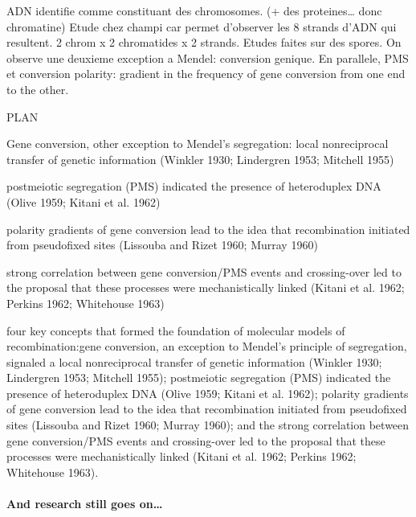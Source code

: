 ADN identifie comme constituant des chromosomes. (+ des proteines… donc chromatine)
Etude chez champi car permet d'observer les 8 strands d'ADN qui resultent. 2 chrom x 2 chromatides x 2 strands.
Etudes faites sur des spores. 
On observe une deuxieme exception a Mendel: conversion genique.
En parallele, PMS
et conversion polarity: gradient in the frequency of gene conversion from one end to the other.










PLAN\:

Gene conversion, other exception to Mendel's segregation: local nonreciprocal transfer of genetic information (Winkler 1930; Lindergren 1953; Mitchell 1955)

postmeiotic segregation (PMS) indicated the presence of heteroduplex DNA (Olive 1959; Kitani et al. 1962)

polarity gradients of gene conversion lead to the idea that recombination initiated from pseudofixed sites (Lissouba and Rizet 1960; Murray 1960)

strong correlation between gene conversion/PMS events and crossing-over led to the proposal that these processes were mechanistically linked (Kitani et al. 1962; Perkins 1962; Whitehouse 1963)








four key concepts that formed the foundation of molecular models of recombination:gene conversion, an exception to Mendel’s principle of segregation, signaled a local nonreciprocal transfer of genetic information (Winkler 1930; Lindergren 1953; Mitchell 1955); postmeiotic segregation (PMS) indicated the presence of heteroduplex DNA (Olive 1959; Kitani et al. 1962); polarity gradients of gene conversion lead to the idea that recombination initiated from pseudofixed sites (Lissouba and Rizet 1960; Murray 1960); and the strong correlation between gene conversion/PMS events and crossing-over led to the proposal that these processes were mechanistically linked (Kitani et al. 1962; Perkins 1962; Whitehouse 1963).









\paragraph{And research still goes on…}


